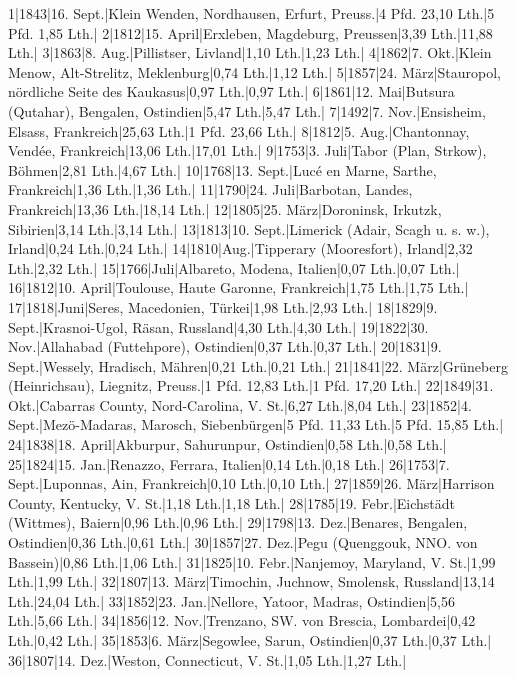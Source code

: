 \documentclass[a4paper, 11pt, oneside]{article}
\begin{document}
1|1843|16. Sept.|Klein Wenden, Nordhausen, Erfurt, Preuss.|4 Pfd. 23,10 Lth.|5 Pfd. 1,85 Lth.|  
2|1812|15. April|Erxleben, Magdeburg, Preussen|3,39 Lth.|11,88 Lth.|  
3|1863|8. Aug.|Pillistser, Livland|1,10 Lth.|1,23 Lth.|  
4|1862|7. Okt.|Klein Menow, Alt-Strelitz, Meklenburg|0,74 Lth.|1,12 Lth.|  
5|1857|24. März|Stauropol, nördliche Seite des Kaukasus|0,97 Lth.|0,97 Lth.|  
6|1861|12. Mai|Butsura (Qutahar), Bengalen, Ostindien|5,47 Lth.|5,47 Lth.|  
7|1492|7. Nov.|Ensisheim, Elsass, Frankreich|25,63 Lth.|1 Pfd. 23,66 Lth.|  
8|1812|5. Aug.|Chantonnay, Vendée, Frankreich|13,06 Lth.|17,01 Lth.|  
9|1753|3. Juli|Tabor (Plan, Strkow), Böhmen|2,81 Lth.|4,67 Lth.|  
10|1768|13. Sept.|Lucé en Marne, Sarthe, Frankreich|1,36 Lth.|1,36 Lth.|  
11|1790|24. Juli|Barbotan, Landes, Frankreich|13,36 Lth.|18,14 Lth.|  
12|1805|25. März|Doroninsk, Irkutzk, Sibirien|3,14 Lth.|3,14 Lth.|  
13|1813|10. Sept.|Limerick (Adair, Scagh u. s. w.), Irland|0,24 Lth.|0,24 Lth.|  
14|1810|Aug.|Tipperary (Mooresfort), Irland|2,32 Lth.|2,32 Lth.|  
15|1766|Juli|Albareto, Modena, Italien|0,07 Lth.|0,07 Lth.|  
16|1812|10. April|Toulouse, Haute Garonne, Frankreich|1,75 Lth.|1,75 Lth.|  
17|1818|Juni|Seres, Macedonien, Türkei|1,98 Lth.|2,93 Lth.|  
18|1829|9. Sept.|Krasnoi-Ugol, Räsan, Russland|4,30 Lth.|4,30 Lth.|  
19|1822|30. Nov.|Allahabad (Futtehpore), Ostindien|0,37 Lth.|0,37 Lth.|  
20|1831|9. Sept.|Wessely, Hradisch, Mähren|0,21 Lth.|0,21 Lth.|  
21|1841|22. März|Grüneberg (Heinrichsau), Liegnitz, Preuss.|1 Pfd. 12,83 Lth.|1 Pfd. 17,20 Lth.|  
22|1849|31. Okt.|Cabarras County, Nord-Carolina, V. St.|6,27 Lth.|8,04 Lth.|  
23|1852|4. Sept.|Mezö-Madaras, Marosch, Siebenbürgen|5 Pfd. 11,33 Lth.|5 Pfd. 15,85 Lth.|  
24|1838|18. April|Akburpur, Sahurunpur, Ostindien|0,58 Lth.|0,58 Lth.|  
25|1824|15. Jan.|Renazzo, Ferrara, Italien|0,14 Lth.|0,18 Lth.|  
26|1753|7. Sept.|Luponnas, Ain, Frankreich|0,10 Lth.|0,10 Lth.|  
27|1859|26. März|Harrison County, Kentucky, V. St.|1,18 Lth.|1,18 Lth.|  
28|1785|19. Febr.|Eichstädt (Wittmes), Baiern|0,96 Lth.|0,96 Lth.|  
29|1798|13. Dez.|Benares, Bengalen, Ostindien|0,36 Lth.|0,61 Lth.|  
30|1857|27. Dez.|Pegu (Quenggouk, NNO. von Bassein)|0,86 Lth.|1,06 Lth.|  
31|1825|10. Febr.|Nanjemoy, Maryland, V. St.|1,99 Lth.|1,99 Lth.|  
32|1807|13. März|Timochin, Juchnow, Smolensk, Russland|13,14 Lth.|24,04 Lth.|  
33|1852|23. Jan.|Nellore, Yatoor, Madras, Ostindien|5,56 Lth.|5,66 Lth.|  
34|1856|12. Nov.|Trenzano, SW. von Brescia, Lombardei|0,42 Lth.|0,42 Lth.|  
35|1853|6. März|Segowlee, Sarun, Ostindien|0,37 Lth.|0,37 Lth.|  
36|1807|14. Dez.|Weston, Connecticut, V. St.|1,05 Lth.|1,27 Lth.|  
\end{document}
